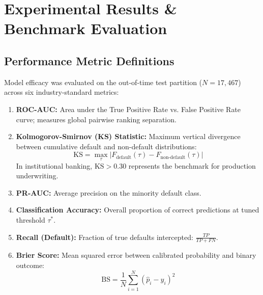 \documentclass[conference]{IEEEtran}
\begin{document}
\section{Experimental Results \& Benchmark Evaluation}

\subsection{Performance Metric Definitions}
Model efficacy was evaluated on the out-of-time test partition ($N = 17,467$) across six industry-standard metrics:
\begin{enumerate}
    \item \textbf{ROC-AUC:} Area under the True Positive Rate vs. False Positive Rate curve; measures global pairwise ranking separation.
    \item \textbf{Kolmogorov-Smirnov (KS) Statistic:} Maximum vertical divergence between cumulative default and non-default distributions:
    \begin{equation}
    \text{KS} = \max_{\tau} |F_{\text{default}}(\tau) - F_{\text{non-default}}(\tau)|
    \end{equation}
    In institutional banking, $\text{KS} > 0.30$ represents the benchmark for production underwriting.
    \item \textbf{PR-AUC:} Average precision on the minority default class.
    \item \textbf{Classification Accuracy:} Overall proportion of correct predictions at tuned threshold $\tau^*$.
    \item \textbf{Recall (Default):} Fraction of true defaults intercepted: $\frac{TP}{TP + FN}$.
    \item \textbf{Brier Score:} Mean squared error between calibrated probability and binary outcome:
    \begin{equation}
    \text{BS} = \frac{1}{N} \sum_{i=1}^N (\hat{p}_i - y_i)^2
    \end{equation}
\end{enumerate}
\end{document}
